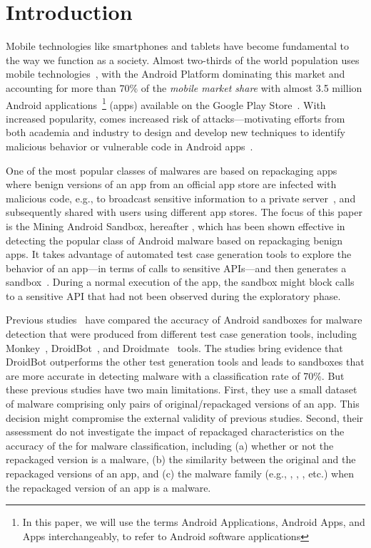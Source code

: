 \section{Introduction}\label{sec:introduction}

Mobile technologies like smartphones and tablets have become fundamental to the way we function as a society. Almost two-thirds of the world population
uses mobile technologies~\cite{Comscore,DBLP:journals/tse/MartinSJZH17}, with the
Android Platform dominating this market and accounting for more than 70\% of the \emph{mobile
market share} with almost 3.5 million Android applications~\footnote{In this paper, we will use the terms Android Applications, Android Apps, and Apps interchangeably, to refer to Android software applications} (apps)
available on the Google Play Store~\cite{Statista}. 
With increased popularity, comes increased risk of attacks---motivating efforts from both academia and industry to design and develop new techniques
to identify malicious behavior or vulnerable code in Android apps~\cite{10.1145/3017427}.


One of the most popular classes of malwares are based on repackaging apps~\cite{DBLP:conf/wcre/BaoLL18,le2018towards} where benign
versions of an app from an official app store are
infected with malicious code, e.g., to broadcast
sensitive information to a private server~\cite{DBLP:journals/tse/LiBK21}, and subsequently shared
with users using different app stores.  The focus of this paper is the Mining Android Sandbox, hereafter \mas, which has been shown effective
in detecting the popular class of Android malware based on 
repackaging benign apps. 
It  takes advantage of automated test case generation tools 
to explore the behavior of an app---in terms of calls to sensitive APIs---and then
generates a sandbox~\cite{DBLP:conf/icse/JamrozikSZ16}. During a normal
execution of the app, the sandbox might block calls to a sensitive API
that had not been observed during the exploratory phase. 


Previous studies~\cite{DBLP:conf/wcre/BaoLL18,DBLP:journals/jss/CostaMMSSBNR22} 
have compared the accuracy of  Android sandboxes for malware detection 
that were produced 
from 
different test case generation tools, including Monkey~\cite{Monkey}, DroidBot~\cite{DBLP:conf/icse/LiYGC17}, and Droidmate~\cite{DBLP:conf/kbse/BorgesHZ18} tools.
The studies bring evidence that 
DroidBot outperforms the other test generation tools and leads to sandboxes that are more accurate in detecting malware with a classification rate of 70\%.
But these previous studies have two main limitations.
First, they use a small dataset of malware comprising only \appsSmall pairs of original/repackaged versions of an app. This decision
might compromise the external validity of previous studies. Second, their assessment do not investigate
the impact of repackaged characteristics on the accuracy of the \mas for malware classification, including
(a) whether or not the repackaged version is a malware, (b) the similarity between the original and the repackaged versions of an app,
and (c) the malware family (e.g., , , , etc.) when the repackaged
version of an app is a malware.

